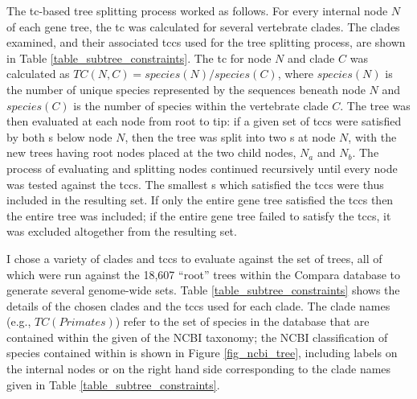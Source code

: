 The \ac{tc}-based tree splitting process worked as follows. For every
internal node $N$ of each \cmp gene tree, the \ac{tc} was calculated
for several vertebrate clades. The clades examined, and their
associated \acp{tcc} used for the tree splitting process, are shown in
Table \ref{table_subtree_constraints}. The \ac{tc} for node $N$ and
clade $C$ was calculated as $TC(N,C) = species(N) / species(C) $,
where $species(N)$ is the number of unique species represented by the
sequences beneath node $N$ and $species(C)$ is the number of species
within the vertebrate clade $C$. The tree was then evaluated at each
node from root to tip: if a given set of \acp{tcc} were satisfied by
both \subtr{}s below node $N$, then the tree was split into two
\subtr{}s at node $N$, with the new trees having root nodes placed at
the two child nodes, $N_a$ and $N_b$. The process of evaluating and
splitting nodes continued recursively until every node was tested
against the \acp{tcc}. The smallest \subtr{}s which satisfied the
\acp{tcc} were thus included in the resulting \subtr{} set. If only
the entire gene tree satisfied the \acp{tcc} then the entire tree was
included; if the entire gene tree failed to satisfy the \acp{tcc}, it
was excluded altogether from the resulting \subtr{} set.

I chose a variety of clades and \acp{tcc} to evaluate against the set
of \cmp trees, all of which were run against the 18,607 ``root'' trees
within the Compara database to generate several genome-wide \subtr
sets. Table \ref{table_subtree_constraints} shows the details of the
chosen clades and the \acp{tcc} used for each clade. The clade names
(e.g., $TC(Primates)$) refer to the set of species in the \ens
database that are contained within the given \subtr of the NCBI
taxonomy; the NCBI classification of species contained within \ens is
shown in Figure \ref{fig_ncbi_tree}, including labels on the internal
nodes or on the right hand side corresponding to the clade names given
in Table \ref{table_subtree_constraints}.

